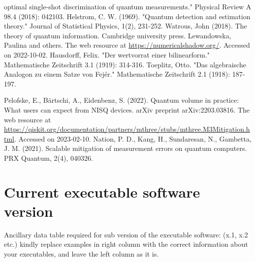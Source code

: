 \documentclass[preprint,12pt, a4paper, dvipsnames]{elsarticle}
\newcommand{\1}{{\rm 1\hspace{-0.9mm}l}}
\begin{document}
\begin{thebibliography}{00}
optimal single-shot discrimination of quantum measurements." Physical Review A
98.4 (2018): 042103.
 Helstrom, C. W. (1969). "Quantum detection and estimation theory." Journal of Statistical Physics, 1(2), 231-252.
 Watrous, John (2018). The theory of quantum information. Cambridge university press.
 Lewandowska, Paulina and others. The web resource at \url{https://numericalshadow.org/}. Accessed on 2022-10-02.
 Hausdorff, Felix. "Der wertvorrat einer bilinearform." Mathematische Zeitschrift 3.1 (1919): 314-316.
 Toeplitz, Otto. "Das algebraische Analogon zu einem Satze von Fejér." Mathematische Zeitschrift 2.1 (1918): 187-197.

 Pelofske, E., B{\"a}rtschi, A., Eidenbenz, S. (2022). Quantum volume in practice: What users can expect from NISQ devices. arXiv preprint arXiv:2203.03816.
 The web resource at \url{https://qiskit.org/documentation/partners/mthree/stubs/mthree.M3Mitigation.html}. Accessed on 2023-02-10.
 Nation, P. D., Kang, H., Sundaresan, N.,  Gambetta, J. M. (2021). Scalable mitigation of measurement errors on quantum computers. PRX Quantum, 2(4), 040326.
\end{thebibliography}



\section*{Current executable software version}
\label{}

Ancillary data table required for sub version of the executable software: (x.1,
x.2 etc.) kindly replace examples in right column with the correct information
about your executables, and leave the left column as it is.
\end{document}
